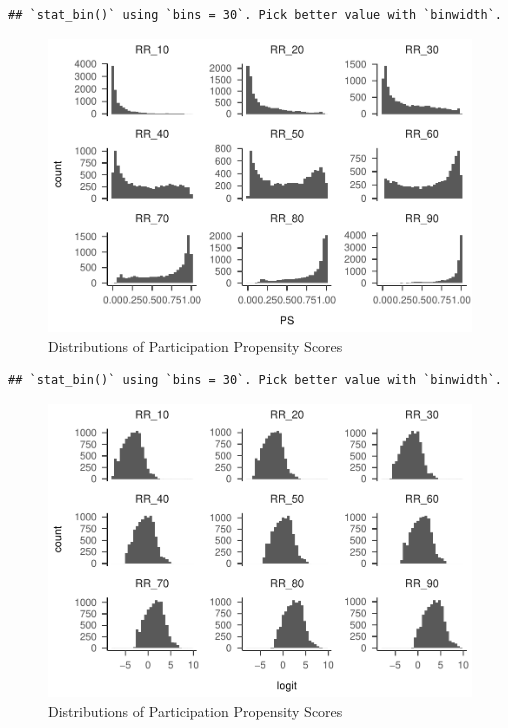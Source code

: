 \documentclass[
  english,
  man,floatsintext]{apa6}
\begin{document}
\begin{verbatim}
## `stat_bin()` using `bins = 30`. Pick better value with `binwidth`.
\end{verbatim}

\begin{figure}
\centering
\includegraphics{5---Analysis_files/figure-latex/unnamed-chunk-13-1.pdf}
\caption{\label{fig:unnamed-chunk-13-1}Distributions of Participation Propensity Scores}
\end{figure}

\begin{verbatim}
## `stat_bin()` using `bins = 30`. Pick better value with `binwidth`.
\end{verbatim}

\begin{figure}
\centering
\includegraphics{5---Analysis_files/figure-latex/unnamed-chunk-13-2.pdf}
\caption{\label{fig:unnamed-chunk-13-2}Distributions of Participation Propensity Scores}
\end{figure}
\end{document}
